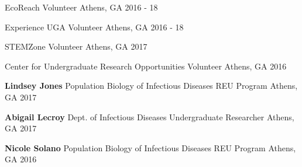 


\begin{cvhonors}


    \cvhonor
      {EcoReach}
      {Volunteer}
      {Athens, GA}
      {2016 - 18}

    \cvhonor
      {Experience UGA}
      {Volunteer}
      {Athens, GA}
      {2016 - 18}

    \cvhonor
      {STEMZone}
      {Volunteer}
      {Athens, GA}
      {2017}

    \cvhonor
      {Center for Undergraduate Research Opportunities} %
      {Volunteer} %
      {Athens, GA} %
      {2016} %
\end{cvhonors}

\begin{cvhonors}

  \cvhonor
    {\textbf{Lindsey Jones}} %
    {Population Biology of Infectious Diseases REU Program} %
    {Athens, GA} %
    {2017} %

  \cvhonor
    {\textbf{Abigail Lecroy}} %
    {Dept. of Infectious Diseases Undergraduate Researcher} %
    {Athens, GA} %
    {2017} %

  \cvhonor
    {\textbf{Nicole Solano}} %
    {Population Biology of Infectious Diseases REU Program} %
    {Athens, GA} %
    {2016} %

\end{cvhonors}

